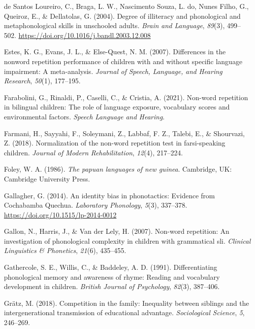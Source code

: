 \documentclass[english,,man,floatsintext]{apa6}
\begin{document}
\leavevmode\hypertarget{ref-de2004degree}{}%
de Santos Loureiro, C., Braga, L. W., Nascimento Souza, L. do, Nunes Filho, G., Queiroz, E., \& Dellatolas, G. (2004). Degree of illiteracy and phonological and metaphonological skills in unschooled adults. \emph{Brain and Language}, \emph{89}(3), 499--502. \url{https://doi.org/10.1016/j.bandl.2003.12.008}

\leavevmode\hypertarget{ref-estes2007differences}{}%
Estes, K. G., Evans, J. L., \& Else-Quest, N. M. (2007). Differences in the nonword repetition performance of children with and without specific language impairment: A meta-analysis. \emph{Journal of Speech, Language, and Hearing Research}, \emph{50}(1), 177--195.

\leavevmode\hypertarget{ref-farabolini2021nonword}{}%
Farabolini, G., Rinaldi, P., Caselli, C., \& Cristia, A. (2021). Non-word repetition in bilingual children: The role of language exposure, vocabulary scores and environmental factors. \emph{Speech Language and Hearing}.

\leavevmode\hypertarget{ref-farmani2018normalization}{}%
Farmani, H., Sayyahi, F., Soleymani, Z., Labbaf, F. Z., Talebi, E., \& Shourvazi, Z. (2018). Normalization of the non-word repetition test in farsi-speaking children. \emph{Journal of Modern Rehabilitation}, \emph{12}(4), 217--224.

\leavevmode\hypertarget{ref-foley1986papuan}{}%
Foley, W. A. (1986). \emph{The papuan languages of new guinea}. Cambridge, UK: Cambridge University Press.

\leavevmode\hypertarget{ref-gallagher2014identity}{}%
Gallagher, G. (2014). An identity bias in phonotactics: Evidence from Cochabamba Quechua. \emph{Laboratory Phonology}, \emph{5}(3), 337--378. \url{https://doi.org/10.1515/lp-2014-0012}

\leavevmode\hypertarget{ref-gallon2007non}{}%
Gallon, N., Harris, J., \& Van der Lely, H. (2007). Non-word repetition: An investigation of phonological complexity in children with grammatical sli. \emph{Clinical Linguistics \& Phonetics}, \emph{21}(6), 435--455.

\leavevmode\hypertarget{ref-gathercole1991differentiating}{}%
Gathercole, S. E., Willis, C., \& Baddeley, A. D. (1991). Differentiating phonological memory and awareness of rhyme: Reading and vocabulary development in children. \emph{British Journal of Psychology}, \emph{82}(3), 387--406.

\leavevmode\hypertarget{ref-gratz2018competition}{}%
Grätz, M. (2018). Competition in the family: Inequality between siblings and the intergenerational transmission of educational advantage. \emph{Sociological Science}, \emph{5}, 246--269.
\end{document}
